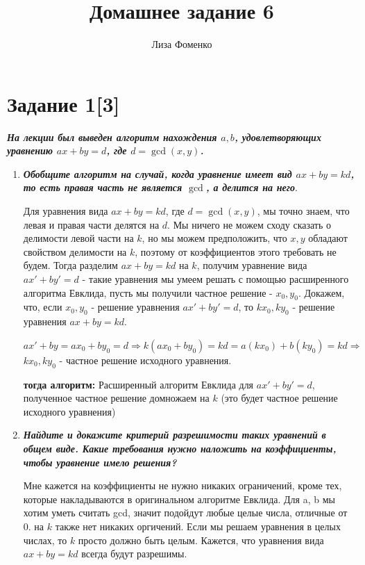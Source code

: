 \documentclass{article}
\title{Домашнее задание 6}
\author{Лиза Фоменко}
\date{}
\begin{document}
\maketitle



\section*{\textbf{Задание 1[3]}} \textbf{\textit{На лекции был выведен алгоритм нахождения $a, b$, удовлетворяющих уравнению $ax + by = d$, где $d = \gcd(x, y)$.}}

\begin{enumerate}
    \item \textbf{\textit{Обобщите алгоритм на случай, когда уравнение имеет вид $ax + by = k d$, то есть правая часть не является $\gcd$, а делится на него}}.

Для уравнения вида $ax + by = k d$, где $d = \gcd(x, y)$, мы точно знаем, что левая и правая части делятся на $d$. Мы ничего не можем сходу сказать о делимости левой части на $k$, но мы можем предположить, что $x, y$ обладают свойством делимости на $k$, поэтому от коэффициентов этого требовать не будем. Тогда разделим $ax + by = k d$ на $k$, получим уравнение вида $ax' + by' = d$ - такие уравнения мы умеем решать с помощью расширенного алгоритма Евклида, пусть мы получили частное решение - $x_0, y_0$. Докажем, что, если $x_0, y_0$ - решение уравнения $ax' + by' = d$, то $kx_0, ky_0$ - решение уравнения $ax + by = k d$.

$ax' + by = ax_0 + by_0 = d \Rightarrow k(ax_0 + by_0) = kd = a(kx_0) + b(ky_0) = kd \Rightarrow $ $kx_0, ky_0$ - частное решение исходного уравнения. 


\textbf{тогда алгоритм:} Расширенный алгоритм Евклида для $ax' + by' = d$, полученное частное решение домножаем на $k$ (это будет частное решение исходного уравнения)


    \item \textbf{\textit{Найдите и докажите критерий разрешимости таких уравнений в общем виде. Какие требования нужно наложить на коэффициенты, чтобы уравнение имело решения?}}

Мне кажется на коэффициенты не нужно никаких ограничений, кроме тех, которые накладываются в оригинальном алгоритме Евклида. Для a, b мы хотим уметь считать gcd, значит подойдут любые целые числа, отличные от 0. на $k$ также нет никаких оргичений. Если мы решаем уравнения в целых числах, то $k$ просто должно быть целым. Кажется, что уравнения вида $ax + by = k d$ всегда будут разрешимы.


\end{enumerate}
\end{document}

